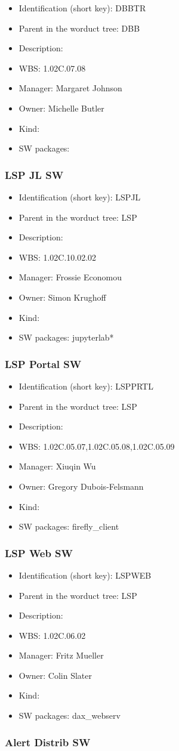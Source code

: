 \begin{itemize}\item Identification (short key): DBBTR
\item Parent in the worduct tree: DBB
\item Description: 
\item WBS: 1.02C.07.08
\item Manager: Margaret Johnson
\item Owner: Michelle Butler
\item Kind:
\item SW packages: 
\end{itemize}\subsubsection{LSP JL SW}
\begin{itemize}\item Identification (short key): LSPJL
\item Parent in the worduct tree: LSP
\item Description: 
\item WBS: 1.02C.10.02.02
\item Manager: Frossie Economou
\item Owner: Simon Krughoff
\item Kind:
\item SW packages: jupyterlab*
\end{itemize}\subsubsection{LSP Portal SW}
\begin{itemize}\item Identification (short key): LSPPRTL
\item Parent in the worduct tree: LSP
\item Description: 
\item WBS: 1.02C.05.07,1.02C.05.08,1.02C.05.09
\item Manager: Xiuqin Wu
\item Owner: Gregory Dubois-Felsmann
\item Kind:
\item SW packages: firefly\_client
\end{itemize}\subsubsection{LSP Web SW}
\begin{itemize}\item Identification (short key): LSPWEB
\item Parent in the worduct tree: LSP
\item Description: 
\item WBS: 1.02C.06.02
\item Manager: Fritz Mueller
\item Owner: Colin Slater
\item Kind:
\item SW packages: dax\_webserv
\end{itemize}\subsubsection{Alert Distrib SW}
